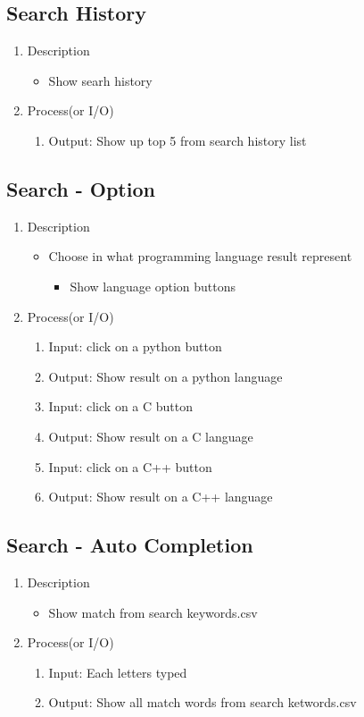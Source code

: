 \documentclass[conference]{IEEEtran}
\begin{document}
\subsection{Search History}
\begin{enumerate}
\item Description
\begin{itemize}
   \item Show searh history
\end{itemize}
\item Process(or I/O)
  \begin{enumerate}
     \item Output: Show up top 5 from search history list
  \end{enumerate}
\end{enumerate}
\textit{}

\subsection{Search - Option}
\begin{enumerate}
\item Description
\begin{itemize}
  \item Choose in what programming language result represent
  \begin{itemize}
     \item Show language option buttons
  \end{itemize}
\end{itemize}
\item Process(or I/O)
  \begin{enumerate}
    \item Input: click on a python button 
    \item Output: Show result on a python language 
    \item Input: click on a C button 
    \item Output: Show result on a C language 
    \item Input: click on a C++ button 
    \item Output: Show result on a C++ language 
  \end{enumerate}
\end{enumerate}
\textit{}

\subsection{Search - Auto Completion}
\begin{enumerate}
\item Description
\begin{itemize}
  \item Show match from search keywords.csv
\end{itemize}
\item Process(or I/O)
  \begin{enumerate}
     \item Input: Each letters typed
    \item Output: Show all match words from search ketwords.csv
  \end{enumerate}
\end{enumerate}
\textit{}
\end{document}

